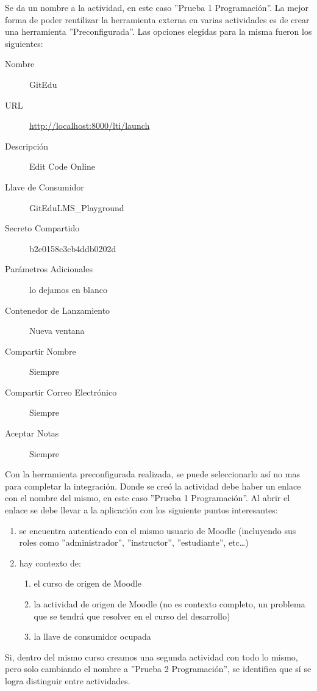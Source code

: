Se da un nombre a la actividad, en este caso ''Prueba 1 Programación''. La mejor forma de poder reutilizar la herramienta externa en varias actividades es de crear una herramienta ''Preconfigurada''. Las opciones elegidas para la misma fueron los siguientes:
\begin{description}
	\item[Nombre] GitEdu
    \item[URL] \url{http://localhost:8000/lti/launch}
    \item[Descripción] Edit Code Online
    \item[Llave de Consumidor] GitEduLMS\_Playground
    \item[Secreto Compartido] b2e0158c3cb4ddb0202d
    \item[Parámetros Adicionales] lo dejamos en blanco
    \item[Contenedor de Lanzamiento] Nueva ventana
    \item[Compartir Nombre] Siempre
    \item[Compartir Correo Electrónico] Siempre
    \item[Aceptar Notas] Siempre
\end{description}
Con la herramienta preconfigurada realizada, se puede seleccionarlo así no mas para completar la integración. Donde se creó la actividad debe haber un enlace con el nombre del mismo, en este caso ''Prueba 1 Programación''. Al abrir el enlace se debe llevar a la aplicación con los siguiente puntos interesantes:
\begin{enumerate}
	\item se encuentra autenticado con el mismo usuario de Moodle (incluyendo sus roles como ''administrador'', ''instructor'', ''estudiante'', etc\ldots{})
    \item hay contexto de:
    \begin{enumerate}
    	\item el curso de origen de Moodle
        \item la actividad de origen de Moodle (no es contexto completo, un problema que se tendrá que resolver en el curso del desarrollo)
        \item la llave de consumidor ocupada
    \end{enumerate}
\end{enumerate}

Si, dentro del mismo curso creamos una segunda actividad con todo lo mismo, pero solo cambiando el nombre a ''Prueba 2 Programación'', se identifica que sí se logra distinguir entre actividades.

